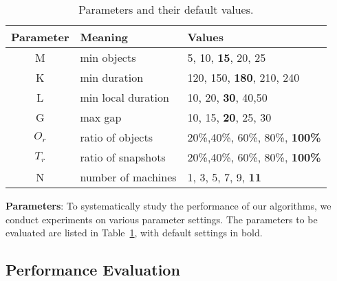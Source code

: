\vspace{-2mm}
\begin{table}[h]
\centering
\begin{tabular}{|c|l|l|}
\hline 
\textbf{Parameter} & \textbf{Meaning} & \textbf{Values} \\ 
\hline 
M & min  objects &  5, 10,  \textbf{15}, 20, 25 \\ 
\hline 
K & min duration & 120, 150, \textbf{180}, 210, 240 \\ 
\hline 
L & min local duration & 10, 20, \textbf{30}, 40,50 \\ 
\hline 
G & max gap & 10, 15, \textbf{20}, 25, 30 \\ 
\hline
$O_r$ & ratio of objects & 20\%,40\%, 60\%, 80\%, \textbf{100\%} \\ \hline
$T_r$ & ratio of snapshots & 20\%,40\%, 60\%, 80\%, \textbf{100\%} \\ \hline
N & number of machines & 1, 3, 5, 7, 9, \textbf{11}\\ 
\hline 
\end{tabular} 
 \vspace{-0.5em}
\caption{Parameters and their default values.}
 \vspace{-0.5em}
\label{tbl:parameters}
\end{table}
 
\textbf{Parameters}: To systematically study the performance of
our algorithms, we conduct experiments on various parameter settings. The parameters to be evaluated are listed in Table~\ref{tbl:parameters}, with default settings in bold. 


\subsection{Performance Evaluation}

